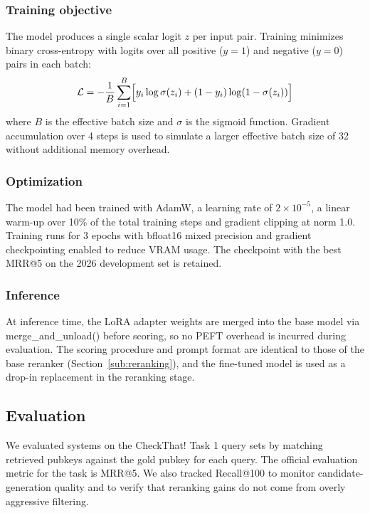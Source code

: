 \subsubsection{Training objective}
The model produces a single scalar logit $z$ per input pair.
Training minimizes binary cross-entropy with logits over all
positive ($y=1$) and negative ($y=0$) pairs in each batch:
\[
    \mathcal{L} = -\frac{1}{B}\sum_{i=1}^{B}
    \Bigl[ y_i \log \sigma(z_i) + (1 - y_i)\log(1 - \sigma(z_i)) \Bigr]
\]
where $B$ is the effective batch size and $\sigma$ is the sigmoid function. Gradient accumulation over 4 steps is used to simulate a larger effective batch size of 32 without additional memory overhead.

\subsubsection{Optimization}
The model had been trained with AdamW, a learning rate of $2 \times 10^{-5}$, a linear warm-up over 10\% of the total training steps and gradient clipping at norm 1.0. Training runs for 3 epochs with bfloat16 mixed precision and gradient checkpointing enabled to reduce VRAM usage. The checkpoint with the best MRR@5 on the 2026 development set is retained.

\subsubsection{Inference}
At inference time, the LoRA adapter weights are merged into the base model via merge\_and\_unload() before scoring, so no PEFT overhead is incurred during evaluation. The scoring procedure and prompt format are identical to those of the base reranker (Section~\ref{sub:reranking}), and the fine-tuned model is used as a drop-in replacement in the reranking stage.

\subsection{Evaluation}
We evaluated systems on the CheckThat! Task 1 query sets by matching retrieved pubkeys against the gold pubkey for each query. The official evaluation metric for the task is MRR@5. We also tracked Recall@100 to monitor candidate-generation quality and to verify that reranking gains do not come from overly aggressive filtering.
